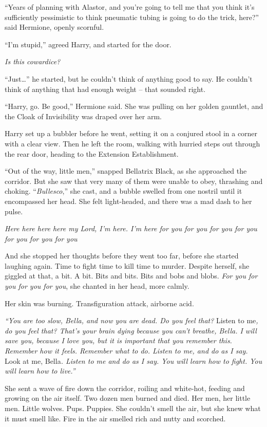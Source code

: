 ``Years of planning with Alastor, and you're going to tell me that you
think it's sufficiently pessimistic to think pneumatic tubing is going
to do the trick, here?'' said Hermione, openly scornful.

``I'm stupid,'' agreed Harry, and started for the door.

\emph{Is this cowardice?}

``Just\ldots{}'' he started, but he couldn't think of anything good to
say. He couldn't think of anything that had enough weight -- that
sounded right.

``Harry, go. Be good,'' Hermione said. She was pulling on her golden
gauntlet, and the Cloak of Invisibility was draped over her arm.

Harry set up a bubbler before he went, setting it on a conjured stool in
a corner with a clear view. Then he left the room, walking with hurried
steps out through the rear door, heading to the Extension Establishment.

\mybreak

``Out of the way, little men,'' snapped Bellatrix Black, as she
approached the corridor. But she saw that very many of them were unable
to obey, thrashing and choking. ``\emph{Bullesco},'' she cast, and a
bubble swelled from one nostril until it encompassed her head. She felt
light-headed, and there was a mad dash to her pulse.

\emph{Here here here here my Lord, I'm here. I'm here for you for you
for you for you for you for you for you}

And she stopped her thoughts before they went too far, before she
started laughing again. Time to fight time to kill time to murder.
Despite herself, she giggled at that, a bit. A bit. Bits and bits. Bits
and bobs and blobs. \emph{For you for you for you for you}, she chanted
in her head, more calmly.

Her skin was burning. Transfiguration attack, airborne acid.

\emph{``You are too slow, Bella, and now you are dead. Do you feel
that?} Listen to me\emph{, do you feel that? That's your brain dying
because you can't breathe, Bella. I will save you, because I love you,
but it is important that you remember this. Remember how it feels.
Remember what to do. Listen to me, and do as I say.} Look at me,
Bella\emph{. Listen to me and do as I say. You will learn how to fight.
You will learn how to live.''}

She sent a wave of fire down the corridor, roiling and white-hot,
feeding and growing on the air itself. Two dozen men burned and died.
Her men, her little men. Little wolves. Pups. Puppies. She couldn't
smell the air, but she knew what it must smell like. Fire in the air
smelled rich and nutty and scorched.

